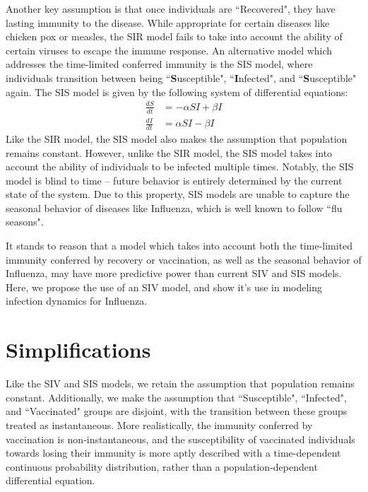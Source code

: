 \documentclass[11pt]{article}
\begin{document}
Another key assumption is that once individuals are ``Recovered", they have lasting immunity to the disease. While appropriate for certain diseases like chicken pox or measles, the SIR model fails to take into account the ability of certain viruses to escape the immune response. An alternative model which addresses the time-limited conferred immunity is the SIS model, where individuals transition between being ``\textbf{S}usceptible", ``\textbf{I}nfected", and ``\textbf{S}usceptible" again. The SIS model is given by the following system of differential equations:
\begin{equation}
\begin{aligned}
\frac{dS}{dt} &= -\alpha S I + \beta I \\
\frac{dI}{dt} &= \alpha S I - \beta I
\end{aligned}
\end{equation}
Like the SIR model, the SIS model also makes the assumption that population remains constant. However, unlike the SIR model, the SIS model takes into account the ability of individuals to be infected multiple times. Notably, the SIS model is blind to time -- future behavior is entirely determined by the current state of the system. Due to this property, SIS models are unable to capture the seasonal behavior of diseases like Influenza, which is well known to follow ``flu seasons".

It stands to reason that a model which takes into account both the time-limited immunity conferred by recovery or vaccination, as well as the seasonal behavior of Influenza, may have more predictive power than current SIV and SIS models. Here, we propose the use of an SIV model, and show it's use in modeling infection dynamics for Influenza.

\section*{Simplifications}
Like the SIV and SIS models, we retain the assumption that population remains constant. Additionally, we make the assumption that ``Susceptible", ``Infected", and ``Vaccinated" groups are disjoint, with the transition between these groups treated as instantaneous. More realistically, the immunity conferred by vaccination is non-instantaneous, and the susceptibility of vaccinated individuals  towards losing their immunity is more aptly described with a time-dependent continuous probability distribution, rather than a population-dependent differential equation.
\end{document}
